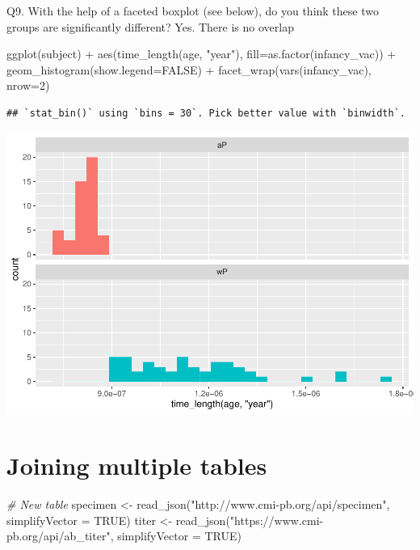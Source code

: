 \documentclass[
]{article}
\newenvironment{Shaded}{\begin{snugshade}}{\end{snugshade}}
\newcommand{\AttributeTok}[1]{\textcolor[rgb]{0.77,0.63,0.00}{#1}}
\newcommand{\CommentTok}[1]{\textcolor[rgb]{0.56,0.35,0.01}{\textit{#1}}}
\newcommand{\ConstantTok}[1]{\textcolor[rgb]{0.00,0.00,0.00}{#1}}
\newcommand{\DecValTok}[1]{\textcolor[rgb]{0.00,0.00,0.81}{#1}}
\newcommand{\FunctionTok}[1]{\textcolor[rgb]{0.00,0.00,0.00}{#1}}
\newcommand{\NormalTok}[1]{#1}
\newcommand{\OtherTok}[1]{\textcolor[rgb]{0.56,0.35,0.01}{#1}}
\newcommand{\SpecialCharTok}[1]{\textcolor[rgb]{0.00,0.00,0.00}{#1}}
\newcommand{\StringTok}[1]{\textcolor[rgb]{0.31,0.60,0.02}{#1}}
\begin{document}
Q9. With the help of a faceted boxplot (see below), do you think these
two groups are significantly different? Yes. There is no overlap

\begin{Shaded}
\begin{Highlighting}[]
\FunctionTok{ggplot}\NormalTok{(subject) }\SpecialCharTok{+}
  \FunctionTok{aes}\NormalTok{(}\FunctionTok{time\_length}\NormalTok{(age, }\StringTok{"year"}\NormalTok{),}
      \AttributeTok{fill=}\FunctionTok{as.factor}\NormalTok{(infancy\_vac)) }\SpecialCharTok{+}
  \FunctionTok{geom\_histogram}\NormalTok{(}\AttributeTok{show.legend=}\ConstantTok{FALSE}\NormalTok{) }\SpecialCharTok{+}
  \FunctionTok{facet\_wrap}\NormalTok{(}\FunctionTok{vars}\NormalTok{(infancy\_vac), }\AttributeTok{nrow=}\DecValTok{2}\NormalTok{) }
\end{Highlighting}
\end{Shaded}

\begin{verbatim}
## `stat_bin()` using `bins = 30`. Pick better value with `binwidth`.
\end{verbatim}

\includegraphics{lab-19-143_files/figure-latex/unnamed-chunk-16-1.pdf}

\hypertarget{joining-multiple-tables}{%
\section{Joining multiple tables}\label{joining-multiple-tables}}

\begin{Shaded}
\begin{Highlighting}[]
\CommentTok{\# New table}
\NormalTok{specimen }\OtherTok{\textless{}{-}} \FunctionTok{read\_json}\NormalTok{(}\StringTok{"http://www.cmi{-}pb.org/api/specimen"}\NormalTok{, }\AttributeTok{simplifyVector =} \ConstantTok{TRUE}\NormalTok{) }
\NormalTok{titer }\OtherTok{\textless{}{-}} \FunctionTok{read\_json}\NormalTok{(}\StringTok{"https://www.cmi{-}pb.org/api/ab\_titer"}\NormalTok{, }\AttributeTok{simplifyVector =} \ConstantTok{TRUE}\NormalTok{) }
\end{Highlighting}
\end{Shaded}
\end{document}
